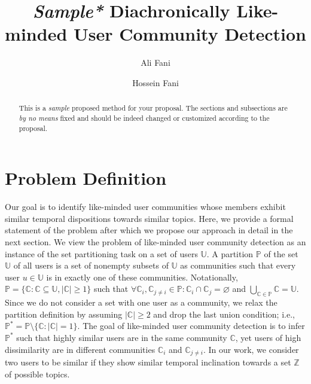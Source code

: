 \documentclass[sigconf]{acmart}
\begin{document}
\title{\textit{Sample*} Diachronically Like-minded User Community Detection}
\author{Ali Fani}
\author{Hossein Fani}

\begin{abstract}
{\color{blue}This is a \textit{sample} proposed method for your proposal. The sections and subsections are \textit{by no means} fixed and should be indeed changed or customized according to the proposal. }
\end{abstract}

\maketitle


\section{Problem Definition}
Our goal is to identify like-minded user communities whose members exhibit similar temporal dispositions towards similar topics. Here, we provide a formal statement of the problem after which we propose our approach in detail in the next section. We view the problem of like-minded user community detection as an instance of the set partitioning task on a set of users $\mathbb{U}$. A partition $\mathbb{P}$ of the set $\mathbb{U}$ of all users is a set of nonempty subsets of $\mathbb{U}$ as communities such that every user $u\in\mathbb{U}$ is in exactly one of these communities. Notationally, $\mathbb{P}= \{\mathbb{C}:\mathbb{C}\subseteq\mathbb{U},|\mathbb{C}|\geq 1\}$ such that $\forall\mathbb{C}_i,\mathbb{C}_{j\neq{i}}\in\mathbb{P}:\mathbb{C}_i\cap\mathbb{C}_j=\varnothing$ and $\bigcup_{\mathbb{C}\in\mathbb{P}}\mathbb{C}=\mathbb{U}$. Since we do not consider a set with one user as a community, we relax the partition definition by assuming $|\mathbb{C}|\geq2$ and drop the last union condition; i.e., $\mathbb{P}^*=\mathbb{P}\setminus\{\mathbb{C}:|\mathbb{C}|=1\}$. The goal of like-minded user community detection is to infer $\mathbb{P}^*$ such that highly similar users are in the same community $\mathbb{C}$, yet users of high dissimilarity are in different communities $\mathbb{C}_i$ and $\mathbb{C}_{j\neq{i}}$. In our work, we consider two users to be similar if they show similar temporal inclination towards a set $\mathbb{Z}$ of possible topics.
\end{document}
